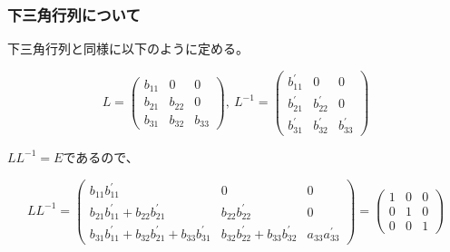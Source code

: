 \documentclass{jsarticle}
\begin{document}
            \subsubsection{下三角行列について}
                下三角行列と同様に以下のように定める。

                \begin{equation*}
                    L = \left(
                        \begin{array}{ccc}
                            b_{11} & 0 & 0 \\
                            b_{21} & b_{22} & 0 \\
                            b_{31} & b_{32} & b_{33}
                        \end{array}
                    \right), \
                    L^{-1} = \left(
                        \begin{array}{ccc}
                            b_{11}^{\prime} & 0 & 0 \\
                            b_{21}^{\prime} & b_{22}^{\prime} & 0 \\
                            b_{31}^{\prime} & b_{32}^{\prime} & b_{33}^{\prime}
                        \end{array}
                    \right)
                \end{equation*}

                $LL^{-1}=E$であるので、
                
                \begin{equation*}
                    LL^{-1} = \left(
                        \begin{array}{ccc}
                            b_{11}b_{11}^{\prime} & 0 & 0 \\
                            b_{21}b_{11}^{\prime} + b_{22}b_{21}^{\prime} & b_{22}b_{22}^{\prime} & 0 \\
                            b_{31}b_{11}^{\prime} + b_{32}b_{21}^{\prime} + b_{33}b_{31}^{\prime} & b_{32}b_{22}^{\prime} + b_{33}b_{32}^{\prime} & a_{33}a_{33}^{\prime}
                        \end{array}
                    \right) = \left(
                        \begin{array}{ccc}
                            1 & 0 & 0 \\
                            0 & 1 & 0 \\
                            0 & 0 & 1
                        \end{array}
                    \right)
                \end{equation*}
\end{document}
